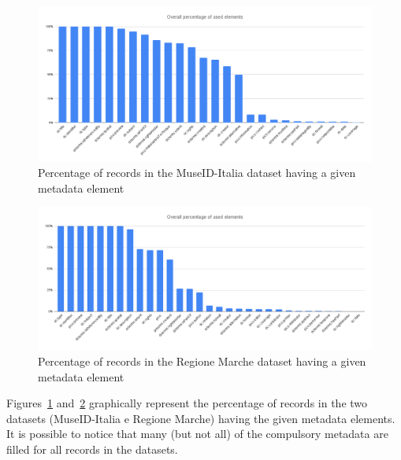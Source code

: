 \documentclass[epsfig,a4paper,12pt,titlepage]{book}
\begin{document}
\begin{figure}[h]
\includegraphics[width=16cm]{mdi_total.png}
\caption{Percentage of records in the MuseID-Italia dataset having a given metadata element}
\label{mdi_total}
\end{figure}
\begin{figure}[H]
\includegraphics[width=16cm]{marche_total.png}
\caption{Percentage of records in the Regione Marche dataset having a given metadata element}
\label{marche_total}
\end{figure}

Figures~\ref{mdi_total} and~\ref{marche_total} graphically represent the percentage of records in the two datasets (MuseID-Italia e Regione Marche) having the given metadata elements. It is possible to notice that many (but not all) of the compulsory metadata are filled for all records in the datasets. 
\end{document}
